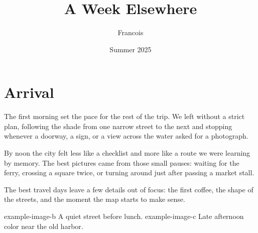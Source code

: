 \documentclass{travelbook}
\title{A Week Elsewhere}
\author{Francois}
\date{Summer 2025}
\begin{document}

\thispagestyle{empty}
\null
\clearpage

\setcounter{page}{1}
\tableofcontents*
\clearpage

\section{Arrival}


The first morning set the pace for the rest of the trip. We left without a
strict plan, following the shade from one narrow street to the next and stopping
whenever a doorway, a sign, or a view across the water asked for a photograph.

By noon the city felt less like a checklist and more like a route we were
learning by memory. The best pictures came from those small pauses: waiting for
the ferry, crossing a square twice, or turning around just after passing a
market stall.

\begin{journey}[Route]
\end{journey}

\begin{travelnote}[Arrival]
The best travel days leave a few details out of focus: the first coffee, the
shape of the streets, and the moment the map starts to make sense.
\end{travelnote}


\twophotos
  {example-image-b}
  {A quiet street before lunch.}
  {example-image-c}
  {Late afternoon color near the old harbor.}
\end{document}

